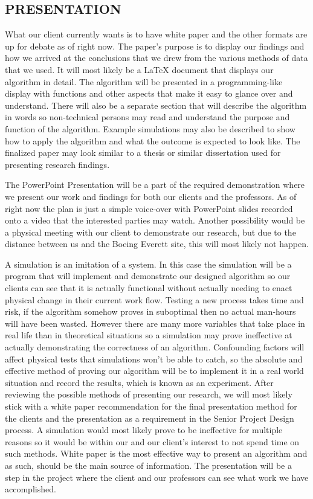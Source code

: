 \documentclass[a4,draftclsnofoot,onecolumn,margin=0.75,10pt]{IEEEtran}
\begin{document}
\subsection[PRESENTATION]{\rmfamily\color{black}
PRESENTATION}
{\color{black}
   What our client currently wants is to have white paper and the other formats are up for debate as of right now. The paper's purpose is to display our findings and how we arrived at the conclusions that we drew from the various methods of data that we used. It will most likely be a LaTeX document that displays our algorithm in detail. The algorithm will be presented in a programming-like display with functions and other aspects that make it easy to glance over and understand. There will also be a separate section that will describe the algorithm in words so non-technical persons may read and understand the purpose and function of the algorithm. Example simulations may also be described to show how to apply the algorithm and what the outcome is expected to look like. The finalized paper may look similar to a thesis or similar dissertation used for presenting research findings. 

   The PowerPoint Presentation will be a part of the required demonstration where we present our work and findings for both our clients and the professors. As of right now the plan is just a simple voice-over with PowerPoint slides recorded onto a video that the interested parties may watch. Another possibility would be a physical meeting with our client to demonstrate our research, but due to the distance between us and the Boeing Everett site, this will most likely not happen.

   A simulation is an imitation of a system. In this case the simulation will be a program that will implement and demonstrate our designed algorithm so our clients can see that it is actually functional without actually needing to enact physical change in their current work flow. Testing a new process takes time and risk, if the algorithm somehow proves in suboptimal then no actual man-hours will have been wasted. However there are many more variables that take place in real life than in theoretical situations so a simulation may prove ineffective at actually demonstrating the correctness of an algorithm. Confounding factors will affect physical tests that simulations won't be able to catch, so the absolute and effective method of proving our algorithm will be to implement it in a real world situation and record the results, which is known as an experiment. After reviewing the possible methods of presenting our research, we will most likely stick with a white paper recommendation for the final presentation method for the clients and the presentation as a requirement in the Senior Project Design process. A simulation would most likely prove to be ineffective for multiple reasons so it would be within our and our client's interest to not spend time on such methods. White paper is the most effective way to present an algorithm and as such, should be the main source of information. The presentation will be a step in the project where the client and our professors can see what work we have accomplished.}
\end{document}
